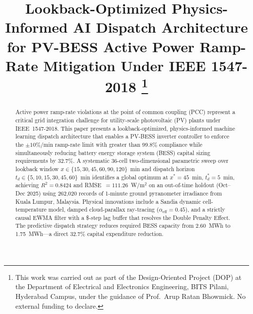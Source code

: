 \documentclass[conference]{IEEEtran}
\begin{document}
\title{Lookback-Optimized Physics-Informed AI Dispatch Architecture
       for PV-BESS Active Power Ramp-Rate Mitigation
       Under IEEE 1547-2018%
\thanks{This work was carried out as part of the Design-Oriented Project (DOP)
at the Department of Electrical and Electronics Engineering, BITS Pilani,
Hyderabad Campus, under the guidance of Prof.\ Arup Ratan Bhowmick.
No external funding to declare.}
}

\author{%
\and
{}
}

\maketitle

\begin{abstract}
Active power ramp-rate violations at the point of common coupling (PCC)
represent a critical grid integration challenge for utility-scale photovoltaic
(PV) plants under IEEE~1547-2018. This paper presents a lookback-optimized,
physics-informed machine learning dispatch architecture that enables a PV-BESS
inverter controller to enforce the $\pm10\%$/min ramp-rate limit with greater
than 99.8\% compliance while simultaneously reducing battery energy storage
system (BESS) capital sizing requirements by 32.7\%. A systematic 36-cell
two-dimensional parametric sweep over lookback window
$x \in \{15,30,45,60,90,120\}$~min and dispatch horizon
$t_d \in \{5,10,15,30,45,60\}$~min identifies a global optimum at
$x^{*}=45$~min, $t_d^{*}=5$~min, achieving $R^2=0.8424$ and
RMSE~$=111.26$~W/m$^2$ on an out-of-time holdout (Oct--Dec 2025) using
262,020 records of 1-minute ground pyranometer irradiance from Kuala Lumpur,
Malaysia. Physical innovations include a Sandia dynamic cell-temperature model,
damped cloud-parallax ray-tracing ($\alpha_{\mathrm{eff}}=0.45$), and a strictly causal EWMA filter with a \$-step lag buffer that resolves the Double Penalty Effect. The predictive
dispatch strategy reduces required BESS capacity from 2.60~MWh to 1.75~MWh---a
direct 32.7\% capital expenditure reduction.
\end{abstract}
\end{document}
